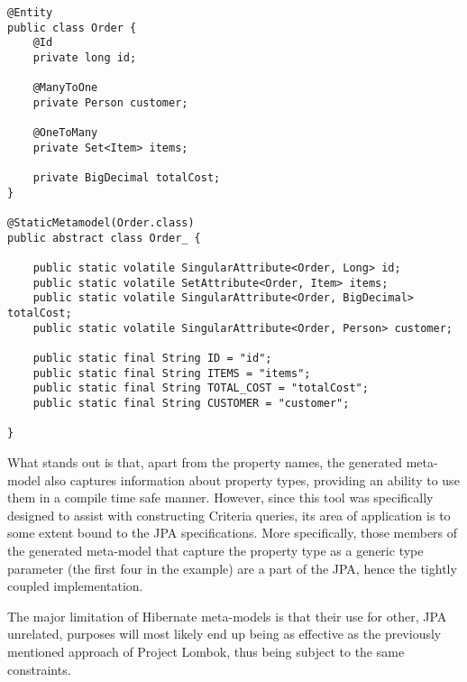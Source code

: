 \begin{verbatim}
@Entity
public class Order {
    @Id
    private long id;

    @ManyToOne
    private Person customer;

    @OneToMany
    private Set<Item> items;

    private BigDecimal totalCost;
}

@StaticMetamodel(Order.class)
public abstract class Order_ {

    public static volatile SingularAttribute<Order, Long> id;
    public static volatile SetAttribute<Order, Item> items;
    public static volatile SingularAttribute<Order, BigDecimal> totalCost;
    public static volatile SingularAttribute<Order, Person> customer;

    public static final String ID = "id";
    public static final String ITEMS = "items";
    public static final String TOTAL_COST = "totalCost";
    public static final String CUSTOMER = "customer";

}

\end{verbatim}

What stands out is that, apart from the property names, the generated meta-model also captures information about property types, providing an ability to use them in a compile time safe manner. However, since this tool was specifically designed to assist with constructing Criteria queries, its area of application is to some extent bound to the JPA specifications. More specifically, those members of the generated meta-model that capture the property type as a generic type parameter (the first four in the example) are a part of the JPA, hence the tightly coupled implementation.

\n

The major limitation of Hibernate meta-models is that their use for other, JPA unrelated, purposes will most likely end up being as effective as the previously mentioned approach of Project Lombok, thus being subject to the same constraints.


